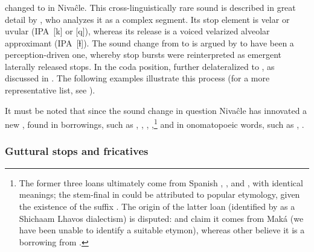 \subsubsection{}\label{ni-kl}

 changed to  in Nivaĉle. This cross-linguistically rare sound is described in great detail by \citet{AnG19-L}, who analyzes it as a complex segment. Its stop element is velar or uvular (IPA~[k] or [q]), whereas its release is a voiced velarized alveolar approximant (IPA~[ɫ]). The sound change from  to  is argued by \citet[64–70]{AnG19-L} to have been a perception-driven one, whereby stop bursts were reinterpreted as emergent laterally released stops. In the coda position,  further delateralized to , as discussed in . The following examples illustrate this process (for a more representative list, see ).

\begin{exe}
    \ex \tell
    \ex \pll
    \ex \killv
    \ex \pet
    \ex \offspring
    \ex \wash
    \ex \winter
    \ex \bow
    \ex \cicada
    \ex \anteater
    \ex \parrot
\end{exe}

It must be noted that since the sound change in question Nivaĉle has innovated a new , found in borrowings, such as , , ,  \citep[252]{AnG15},\footnote{The former three loans ultimately come from Spanish , , and , with identical meanings; the stem-final  in  could be attributed to popular etymology, given the existence of the suffix . The origin of the latter loan (identified by \citealt[8]{LC20} as a Shichaam Lhavos dialectism) is disputed: \citet[60]{NS87} and \citet[124]{JS16} claim it comes from Maká (we have been unable to identify a suitable etymon), whereas other believe it is a borrowing from  \citep{MF97}.} and in onomatopoeic words, such as ,  \citep[60]{NS87}.

\subsubsection{Guttural stops and fricatives}\label{ni-vel-uv}

